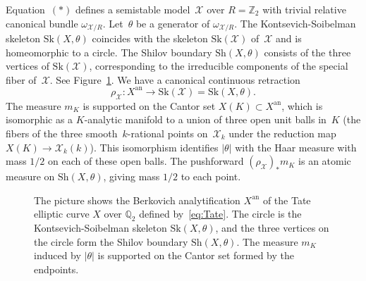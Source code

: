 \documentclass[JEP,XML,SOM,Unicode,NoFloatCountersInSection]{cedram}
\theoremstyle{definition}
\numberwithin{equation}{subsection}
\newcommand{\Z}{\ensuremath{\mathbb{Z}}}
\newcommand{\Q}{\ensuremath{\mathbb{Q}}}
\newcommand{\cX}{\ensuremath{\mathscr{X}}}
\newcommand{\an}{\mathrm{an}}
\newcommand{\Sh}{\mathrm{Sh}}
\newcommand{\Sk}{\mathrm{Sk}}
\let\form\theta
\begin{document}
Equation~$(*)$ defines a semistable model~$\cX$ over $R=\Z_2$ with trivial relative canonical bundle $\omega_{\cX/R}$. Let~$\form$ be a generator of
$\omega_{\cX/R}$.
The Kontsevich-Soibelman skeleton $\Sk(X,\form)$ coincides with the skeleton $\Sk(\cX)$ of~$\cX$ and is homeomorphic to a circle. The Shilov boundary $\Sh(X,\form)$ consists of the three vertices of $\Sk(\cX)$,
corresponding to the irreducible components of the special fiber of~$\cX$. See Figure~\ref{F101}. We have a canonical continuous retraction
\[
\rho_{\cX}\colon X^{\an}\to \Sk(\cX)=\Sk(X,\form).
\]
The measure $m_K$ is supported on the Cantor set $X(K)\subset X^{\an}$, which is isomorphic as a $K$\nobreakdash-analytic manifold to a union of three open unit balls in~$K$ (the fibers of the three smooth~$k$-rational points on~$\cX_k$ under the reduction map $X(K)\to \cX_k(k)$). This isomorphism identifies $|\form|$ with the Haar measure with mass $1/2$ on each of these open balls.
The pushforward $(\rho_{\cX})_*m_K$ is an atomic measure on $\Sh(X,\form)$, giving mass $1/2$ to each point.
\begin{figure}[ht]
\centering
{}
\caption{\smaller The picture shows the Berkovich analytification $X^{\an}$ of the Tate elliptic curve $X$ over $\Q_2$ defined by~\eqref{eq:Tate}. The circle is the Kontsevich-Soibelman skeleton $\Sk(X,\form)$, and the three vertices on the circle form the Shilov boundary $\Sh(X,\form)$. The measure $m_K$ induced by $|\form|$ is supported on the Cantor set formed by the endpoints.}\label{F101}
\end{figure}
\end{document}
